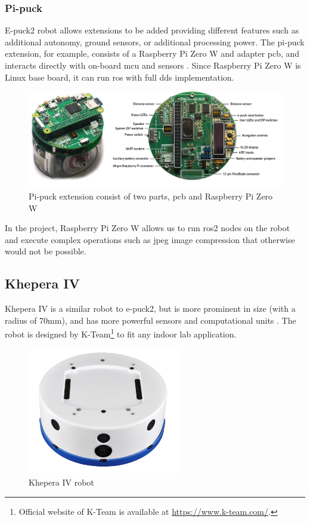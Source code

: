 \subsubsection{Pi-puck}

E-puck2 robot allows extensions to be added providing different features such as additional autonomy, ground sensors, or additional processing power.
The pi-puck extension, for example, consists of a Raspberry Pi Zero W and adapter \ac{pcb}, and interacts directly with on-board \ac{mcu} and sensors \cite{millard_pi-puck_2017}.
Since Raspberry Pi Zero W is Linux base board, it can run \ac{ros} with full \ac{dds} implementation.

\begin{figure}[H]
    \centering
    \includegraphics[width=\textwidth]{background/figures/pi-puck.png}
    \caption{Pi-puck extension consist of two parts, \ac{pcb} and Raspberry Pi Zero W \cite{millard_pi-puck_2017}}
    \label{fig:background:pi-puck}
\end{figure}

In the project, Raspberry Pi Zero W allows us to run \ac{ros2} nodes on the robot and execute complex operations such as \acs{jpeg} image compression that otherwise would not be possible.

\subsection{Khepera IV}

Khepera IV is a similar robot to e-puck2, but is more prominent in size (with a radius of 70mm), and has more powerful sensors and computational units \cite{reis_khepera_2016}.
The robot is designed by K-Team\footnote{Official website of K-Team is available at \url{https://www.k-team.com/}.} to fit any indoor lab application.

\begin{figure}[H]
    \centering
    \includegraphics[width=0.6\textwidth]{background/figures/khepera_iv.png}
    \caption{Khepera IV robot \cite{reis_khepera_2016}}
    \label{fig:background:khepera_iv}
\end{figure}

